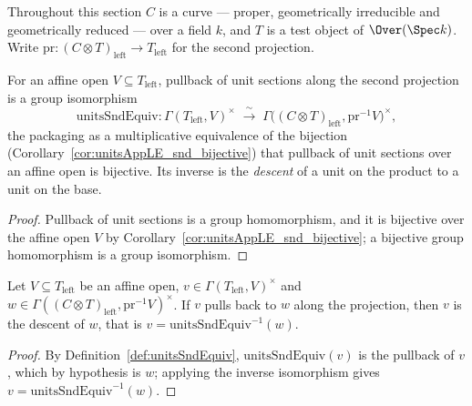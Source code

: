 Throughout this section \(C\) is a curve — proper, geometrically irreducible and geometrically
reduced — over a field \(k\), and \(T\) is a test object of \(\Over(\Spec k)\).  Write
\(\mathrm{pr} \colon (C \otimes T)_{\mathrm{left}} \to T_{\mathrm{left}}\) for the second
projection.

\begin{definition}
  \label{def:unitsSndEquiv}
  \leanok
  For an affine open \(V \subseteq T_{\mathrm{left}}\), pullback of unit sections along the
  second projection is a group isomorphism
  \[
    \mathrm{unitsSndEquiv} \colon \Gamma(T_{\mathrm{left}}, V)^{\times} \;\xrightarrow{\ \sim\
    }\; \Gamma\bigl((C \otimes T)_{\mathrm{left}}, \mathrm{pr}^{-1} V\bigr)^{\times},
  \]
  the packaging as a multiplicative equivalence of the bijection
  (Corollary~\ref{cor:unitsAppLE_snd_bijective}) that pullback of unit sections over an affine
  open is bijective.  Its inverse is the \emph{descent} of a unit on the product to a unit on
  the base.
\end{definition}
\begin{proof}
  \leanok
  Pullback of unit sections is a group homomorphism, and it is bijective over the affine open
  \(V\) by Corollary~\ref{cor:unitsAppLE_snd_bijective}; a bijective group homomorphism is a
  group isomorphism.
\end{proof}

\begin{lemma}
  \label{lem:unitsSndEquiv_symm_eq_of_unitsAppLE}
  \uses{def:unitsSndEquiv}
  \leanok
  Let \(V \subseteq T_{\mathrm{left}}\) be an affine open, \(v \in \Gamma(T_{\mathrm{left}},
  V)^{\times}\) and \(w \in \Gamma((C \otimes T)_{\mathrm{left}}, \mathrm{pr}^{-1}
  V)^{\times}\).  If \(v\) pulls back to \(w\) along the projection, then \(v\) is the descent
  of \(w\), that is \(v = \mathrm{unitsSndEquiv}^{-1}(w)\).
\end{lemma}
\begin{proof}
  \leanok
  By Definition~\ref{def:unitsSndEquiv}, \(\mathrm{unitsSndEquiv}(v)\) is the pullback of \(v\),
  which by hypothesis is \(w\); applying the inverse isomorphism gives \(v =
  \mathrm{unitsSndEquiv}^{-1}(w)\).
\end{proof}

